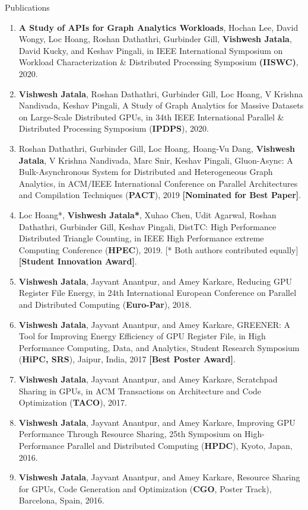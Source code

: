 \documentclass{resume} %
\begin{document}
\begin{rSection}{Publications}
\begin{enumerate}
\item \textbf{A Study of APIs for Graph Analytics Workloads}, Hochan Lee, David Wongy, Loc Hoang, Roshan Dathathri, Gurbinder Gill, \textbf{Vishwesh Jatala}, David Kucky, and Keshav Pingali, in IEEE International Symposium on Workload Characterization \& Distributed Processing Symposium \textbf{(IISWC)}, 2020.
\item \textbf{Vishwesh Jatala}, Roshan Dathathri, Gurbinder Gill, Loc Hoang, V Krishna Nandivada, Keshav Pingali, A Study of Graph Analytics for Massive Datasets on Large-Scale Distributed GPUs, in 34th IEEE International Parallel \& Distributed Processing Symposium (\textbf{IPDPS}), 2020. %
\item Roshan Dathathri, Gurbinder Gill, Loc Hoang, Hoang-Vu Dang, \textbf{Vishwesh Jatala}, V Krishna Nandivada, Marc Snir, Keshav Pingali, Gluon-Async: A Bulk-Asynchronous System for Distributed and Heterogeneous Graph Analytics, in ACM/IEEE International Conference on Parallel Architectures and Compilation Techniques (\textbf{PACT}), 2019 \textbf{[Nominated for Best Paper]}.
\item Loc Hoang*, \textbf{Vishwesh Jatala*}, Xuhao Chen, Udit Agarwal, Roshan Dathathri, Gurbinder Gill, Keshav Pingali, DistTC: High Performance Distributed Triangle Counting, in IEEE High Performance extreme Computing Conference (\textbf{HPEC}), 2019.  [* Both authors contributed equally] \textbf{[Student Innovation Award]}.
\item \textbf{Vishwesh Jatala}, Jayvant Anantpur, and Amey Karkare, Reducing GPU Register File Energy, in 24th International European Conference on Parallel and Distributed Computing (\textbf{Euro-Par}), 2018. 
\item \textbf{Vishwesh Jatala}, Jayvant Anantpur, and Amey Karkare, GREENER: A Tool for Improving Energy Efficiency of GPU Register File, in High Performance Computing, Data, and Analytics, Student Research Symposium (\textbf{HiPC, SRS}), Jaipur, India, 2017 \textbf{[Best Poster Award]}. 
\item \textbf{Vishwesh Jatala}, Jayvant Anantpur, and Amey Karkare, Scratchpad Sharing in GPUs, in ACM Transactions on Architecture and Code Optimization (\textbf{TACO}), 2017. 
\item \textbf{Vishwesh Jatala}, Jayvant Anantpur, and Amey Karkare, Improving GPU Performance Through Resource Sharing, 25th Symposium on High-Performance Parallel and Distributed Computing (\textbf{HPDC}), Kyoto, Japan, 2016.
\item \textbf{Vishwesh Jatala}, Jayvant Anantpur, and Amey Karkare, Resource Sharing for GPUs, Code Generation and Optimization (\textbf{CGO}, Poster Track), Barcelona, Spain, 2016.
\end{enumerate}
\end{rSection}
\end{document}
